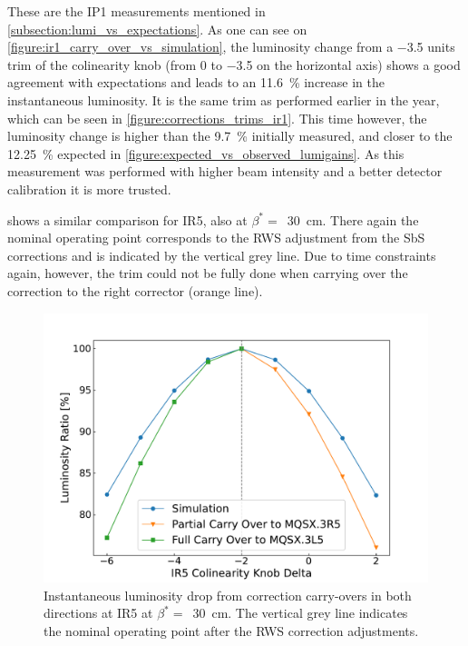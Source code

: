 \begin{noteblock}
    These are the IP\num{1} measurements mentioned in \cref{subsection:lumi_vs_expectations}.
    As one can see on \cref{figure:ir1_carry_over_vs_simulation}, the luminosity change from a \num{-3.5} units trim of the colinearity knob (from \num{0} to \num{-3.5} on the horizontal axis) shows a good agreement with expectations and leads to an \qty{11.6}{\percent} increase in the instantaneous luminosity.
    It is the same trim as performed earlier in the year, which can be seen in \cref{figure:corrections_trims_ir1}.
    This time however, the luminosity change is higher than the \qty{9.7}{\percent} initially measured, and closer to the \qty{12.25}{\percent} expected in \cref{figure:expected_vs_observed_lumigains}.
    As this measurement was performed with higher beam intensity and a better detector calibration it is more trusted.
\end{noteblock}

 shows a similar comparison for IR\num{5}, also at \(\beta^{\ast} =\)~\qty{30}{\centi\meter}.
There again the nominal operating point corresponds to the \gls{RWS} adjustment from the SbS corrections and is indicated by the vertical grey line.
Due to time constraints again, however, the trim could not be fully done when carrying over the correction to the right corrector (\textcolor{mplorange}{orange} line).

\begin{figure}[!htb]
    \centering
    \includegraphics*[width=\textwidth]{Figures/IR_Coupling_Correction/ir5_scans_vs_simu.pdf}
    \caption{Instantaneous luminosity drop from correction carry-overs in both directions at IR\num{5} at \(\beta^{\ast} =\)~\qty{30}{\centi\meter}. The vertical grey line indicates the nominal operating point after the RWS correction adjustments.}
    \label{figure:ir5_carry_over_vs_simulations}
\end{figure}

